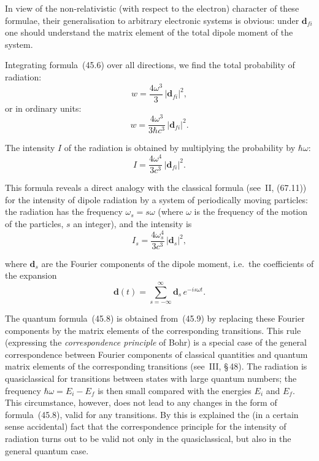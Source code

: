 In view of the non-relativistic (with respect to the electron) character of these formulae, their generalisation to arbitrary electronic systems is obvious: under $\mathbf{d}_{fi}$ one should understand the matrix element of the total dipole moment of the system.

Integrating formula~(45.6) over all directions, we find the total probability of radiation:
\begin{equation}
w = \frac{4\omega^3}{3}\,|\mathbf{d}_{fi}|^2,
\tag{45.7}
\end{equation}
or in ordinary units:
\begin{equation}
w = \frac{4\omega^3}{3\hbar c^3}\,|\mathbf{d}_{fi}|^2.
\tag{45.7a}
\end{equation}

The intensity $I$ of the radiation is obtained by multiplying the probability by $\hbar\omega$:
\begin{equation}
I = \frac{4\omega^4}{3c^3}\,|\mathbf{d}_{fi}|^2.
\tag{45.8}
\end{equation}

This formula reveals a direct analogy with the classical formula (see~II, (67.11)) for the intensity of dipole radiation by a system of periodically moving particles: the radiation has the frequency $\omega_s = s\omega$ (where $\omega$ is the frequency of the motion of the particles, $s$ an integer), and the intensity is
\begin{equation}
I_s = \frac{4\omega_s^4}{3c^3}\,|\mathbf{d}_s|^2,
\tag{45.9}
\end{equation}

where $\mathbf{d}_s$ are the Fourier components of the dipole moment, i.e.\ the coefficients of the expansion
\begin{equation}
\mathbf{d}(t) = \sum_{s=-\infty}^{\infty}\mathbf{d}_s\,e^{-is\omega t}.
\tag{45.10}
\end{equation}

The quantum formula~(45.8) is obtained from~(45.9) by replacing these Fourier components by the matrix elements of the corresponding transitions. This rule (expressing the \textit{correspondence principle} of Bohr) is a special case of the general correspondence between Fourier components of classical quantities and quantum matrix elements of the corresponding transitions (see~III, \S\,48). The radiation is quasiclassical for transitions between states with large quantum numbers; the frequency $\hbar\omega = E_i - E_f$ is then small compared with the energies $E_i$ and $E_f$. This circumstance, however, does not lead to any changes in the form of formula~(45.8), valid for any transitions. By this is explained the (in a certain sense accidental) fact that the correspondence principle for the intensity of radiation turns out to be valid not only in the quasiclassical, but also in the general quantum case.
